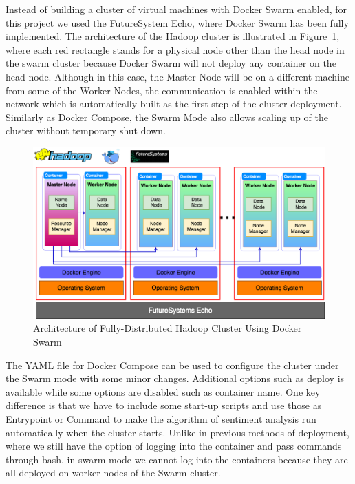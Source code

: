 Instead of building a cluster of virtual machines with Docker Swarm enabled, 
for this project we used the FutureSystem Echo, where Docker Swarm has 
been fully implemented. The architecture of the Hadoop cluster is illustrated 
in Figure~\ref{f:hadoop-swarm}, where each red rectangle stands for a 
physical node other than the head node in the swarm cluster because Docker 
Swarm will not deploy any container on the head node. Although in this case, 
the Master Node will be on a different machine from some of the Worker 
Nodes, the communication is enabled within the network which is 
automatically built as the first step of the cluster deployment. 
Similarly as Docker Compose, the Swarm Mode also allows scaling up of the 
cluster without temporary shut down. 

\begin{figure}[!ht]
	\centering\includegraphics[width=\columnwidth]{images/hadoop-docker-swarm.png}
	\caption{Architecture of Fully-Distributed 
		Hadoop Cluster Using Docker Swarm}\label{f:hadoop-swarm}
\end{figure}

The YAML file for Docker Compose can be used to configure the cluster 
under the Swarm mode with some minor changes. Additional options such as 
deploy is available while some options are disabled such as container name. 
One key difference is that we have to include some start-up scripts and use 
those as Entrypoint or Command to make the algorithm of sentiment analysis 
run automatically when the cluster starts. Unlike in previous methods of 
deployment, where we still have the option of logging into the container and 
pass commands through bash, in swarm mode we cannot log into the 
containers because they are all deployed on worker nodes of the Swarm 
cluster. 

